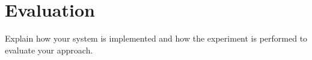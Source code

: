 \section{Evaluation}
\label{sec6}

Explain how your system is implemented and how the experiment is performed to evaluate your approach.